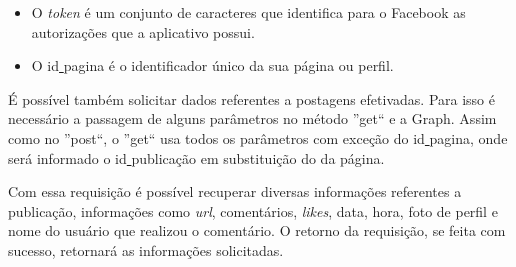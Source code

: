 \begin{itemize}
\item O \textit{token} é um conjunto de caracteres que identifica para o Facebook as autorizações que a aplicativo possui.

\item O id\underline{{ }}pagina é o identificador único da sua página ou perfil.
\end{itemize}

É possível também solicitar dados referentes a postagens efetivadas. Para isso é necessário a passagem de alguns parâmetros no método ''get`` e a Graph. Assim como no ''post``, o ''get`` usa todos os parâmetros com exceção do id\underline{{ }}pagina, onde será informado o id\underline{{ }}publicação em substituição do da página.

Com essa requisição é possível recuperar diversas informações referentes a publicação, informações como \textit{url}, comentários, \textit{likes}, data, hora, foto de perfil e nome do usuário que realizou o comentário. O retorno da requisição, se feita com sucesso, retornará as informações solicitadas.